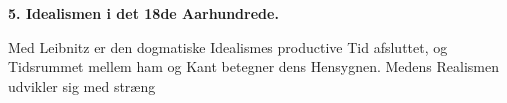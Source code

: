 \documentclass[12pt,a4paper]{book}
\begin{document}
\begin{center}
  \textbf{5. Idealismen i det 18de Aarhundrede.}
\end{center}
Med Leibnitz er den dogmatiske Idealismes productive
Tid afsluttet, og Tidsrummet mellem ham og Kant betegner
dens Hensygnen. Medens Realismen udvikler sig med stræng
\end{document}
